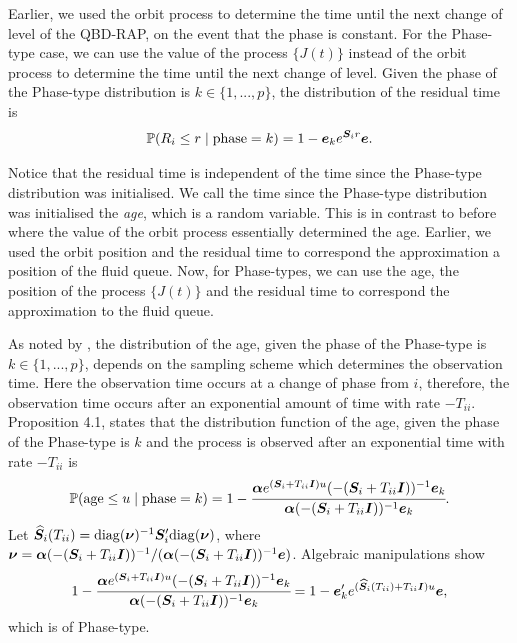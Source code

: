 Earlier, we used the orbit process to determine the time until the next change of level of the QBD-RAP, on the event that the phase is constant. For the Phase-type case, we can use the value of the process \(\{J(t)\}\) instead of the orbit process to determine the time until the next change of level. 
Given the phase of the Phase-type distribution is \(k\in\{1,...,p\}\), the distribution of the residual time is 
\[\mathbb P(R_i\leq r \mid \mbox{phase}=k)=1-\boldsymbol e_k e^{\boldsymbol S_i r}\boldsymbol e.\]

Notice that the residual time is independent of the time since the Phase-type distribution was initialised. We call the time since the Phase-type distribution was initialised the \emph{age}, which is a random variable. This is in contrast to before where the value of the orbit process essentially determined the age. Earlier, we used the orbit position and the residual time to correspond the approximation a position of the fluid queue. Now, for Phase-types, we can use the age, the position of the process \(\{J(t)\}\) and the residual time to correspond the approximation to the fluid queue. 

As noted by \cite{hmp2017}, the distribution of the age, given the phase of the Phase-type is \(k\in\{1,...,p\}\), depends on the sampling scheme which determines the observation time. Here the observation time occurs at a change of phase from \(i\), therefore, the observation time occurs after an exponential amount of time with rate \(-T_{ii}\). Proposition 4.1, \cite{hmp2017} states that the distribution function of the age, given the phase of the Phase-type is \(k\) and the process is observed after an exponential time with rate \(-T_{ii}\) is 
\[\mathbb P(\mbox{age}\leq u \mid \mbox{phase}=k )=1-\cfrac{\boldsymbol \alpha e^{(\boldsymbol S_i + T_{ii}\boldsymbol I)u}(-(\boldsymbol S_i+ T_{ii}\boldsymbol I))^{-1}\boldsymbol e_k}{\boldsymbol \alpha (-(\boldsymbol S_i+ T_{ii}\boldsymbol I))^{-1}\boldsymbol e_k}.\]
Let \(\widehat{ \boldsymbol S}_i(T_{ii}) = \mathrm{diag}(\boldsymbol \nu)^{-1}\boldsymbol S_i'\mathrm{diag}(\boldsymbol \nu)\), where \(\boldsymbol \nu = \boldsymbol\alpha(-(\boldsymbol S_i+ T_{ii}\boldsymbol I))^{-1}/(\boldsymbol\alpha(-(\boldsymbol S_i+ T_{ii}\boldsymbol I))^{-1}\boldsymbol e)\). Algebraic manipulations show
\begin{align}
	1-\cfrac{\boldsymbol \alpha e^{(\boldsymbol S_i + T_{ii}\boldsymbol I)u}(-(\boldsymbol S_i+ T_{ii}\boldsymbol I))^{-1}\boldsymbol e_k}{\boldsymbol \alpha (-(\boldsymbol S_i+ T_{ii}\boldsymbol I))^{-1}\boldsymbol e_k}
	= 1-\boldsymbol e_k' e^{(\widehat{\boldsymbol S}_i(T_{ii}) + T_{ii}\boldsymbol I)u} \boldsymbol e,\label{eqn: skgj}
\end{align}
which is of Phase-type. 

